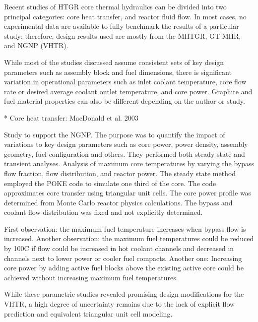 Recent studies of HTGR core thermal hydraulics can be divided into two principal categories: core heat transfer, and reactor fluid flow.
In most cases, no experimental data are available to fully benchmark the results of a particular study; therefore, design results used are mostly from the MHTGR, GT-MHR, and NGNP (VHTR).

While most of the studies discussed assume consistent sets of key design parameters such as assembly block and fuel dimensions, there is significant variation in operational parameters such as inlet coolant temperature, core flow rate or desired average coolant outlet temperature, and core power.
Graphite and fuel material properties can also be different depending on the author or study.

* Core heat transfer:
MacDonald et al. 2003 %

Study to support the NGNP.
The purpose was to quantify the impact of variations to key design parameters such as core power, power density, assembly geometry, fuel configuration and others.
They performed both steady state and transient analyses.
Analysis of maximum core temperatures by varying the bypass flow fraction, flow distribution, and reactor power.
The steady state method employed the POKE code to simulate one third of the core.
The code approximates core transfer using triangular unit cells.
The core power profile was determined from Monte Carlo reactor physics calculations.
The bypass and coolant flow distribution was fixed and not explicitly determined.

First observation: the maximum fuel temperature increases when bypass flow is increased.
Another observation: the maximum fuel temperatures could be reduced by 100C if flow could be increased in hot coolant channels and decreased in channels next to lower power or cooler fuel compacts.
Another one: Increasing core power by adding active fuel blocks above the existing active core could be achieved without increasing maximum fuel temperatures.

While these parametric studies revealed promising design modifications for the VHTR, a high degree of uncertainty remains due to the lack of explicit flow prediction and equivalent triangular unit cell modeling.

